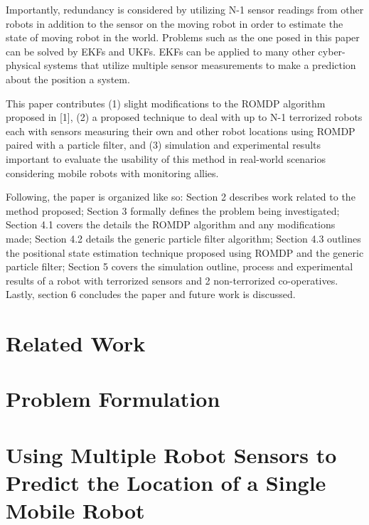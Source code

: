 \documentclass[conference]{IEEEtran}
\begin{document}
\par
Importantly, redundancy is considered by utilizing N-1 sensor readings from other robots in addition to the
sensor on the moving robot in order to estimate the state of moving robot in the world. Problems such as the one posed in this paper can be solved by EKFs and UKFs. EKFs can be applied to many other cyber-physical systems that utilize multiple sensor measurements to make a prediction about the position a system.
\par
This paper contributes (1) slight modifications to the ROMDP algorithm proposed in [1], (2) a proposed technique
to deal with up to N-1 terrorized robots each with sensors measuring their own and other robot locations
using ROMDP paired with a particle filter, and (3) simulation and experimental results important to evaluate
the usability of this method in real-world scenarios considering mobile robots with monitoring allies.
\par
Following, the paper is organized like so: Section 2 describes work related to the method proposed; Section 3
formally defines the problem being investigated; Section 4.1 covers the details the ROMDP algorithm and any
modifications made; Section 4.2 details the generic particle filter algorithm; Section 4.3 outlines the positional
state estimation technique proposed using ROMDP and the generic particle filter; Section 5 covers the
simulation outline, process and experimental results of a robot with terrorized sensors and 2 non-terrorized
co-operatives. Lastly, section 6 concludes the paper and future work is discussed.

\section{Related Work}


\section{Problem Formulation}



\section{Using Multiple Robot Sensors to Predict the Location of a Single Mobile Robot}
\end{document}
